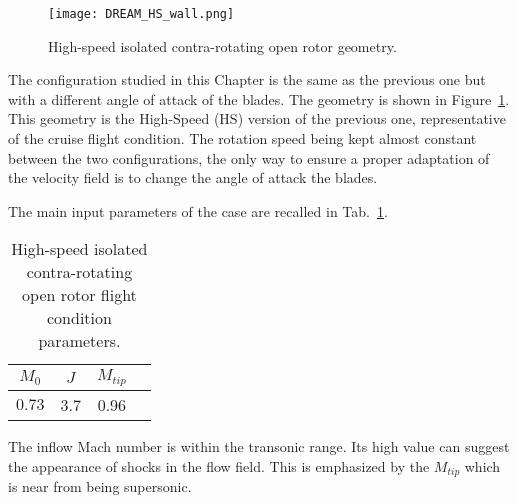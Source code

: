 
\begin{figure}[htp]
  \centering
  \texttt{[image: DREAM\_HS\_wall.png]}
  \caption{High-speed isolated contra-rotating open rotor geometry.}
  \label{fig:dream_hs_wall}
\end{figure}

The configuration studied in this Chapter is the same as the
previous one but with a different angle of attack of
the blades. The geometry is shown in Figure~\ref{fig:dream_hs_wall}.
This geometry is the High-Speed (HS) version of the previous one, 
representative of the cruise flight condition. The rotation speed being kept
almost constant between the two configurations, the only way to ensure
a proper adaptation of the velocity field is to change the angle of 
attack the blades.

The main input parameters of the case are recalled in
Tab.~\ref{tab:dream_hs_flight_condition}.
\begin{table}[htp]
   \centering
  \begin{tabular}{cccc}
    \toprule
    $M_0$ & $J$ & $M_{tip}$ \\
    \midrule
    $0.73$ & 3.7 & 0.96  \\
    \bottomrule
  \end{tabular}
  \caption{High-speed isolated contra-rotating open rotor flight condition parameters.}
  \label{tab:dream_hs_flight_condition}
\end{table} 
The inflow Mach number is within the transonic range. Its high value
can suggest the appearance of shocks in the flow field. 
This is emphasized by the $M_{tip}$ which is
near from being supersonic.
